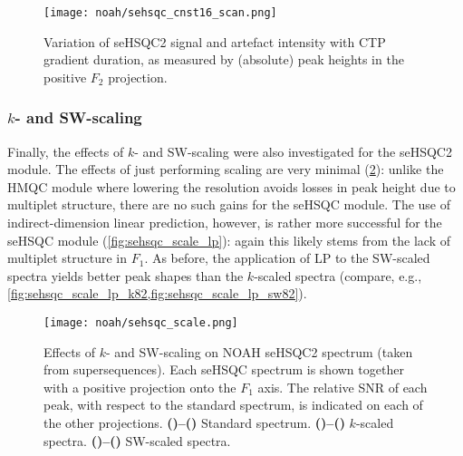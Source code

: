 \begin{figure}[!ht]
    \centering
    \texttt{[image: noah/sehsqc\_cnst16\_scan.png]}%
    \caption[Variation of seHSQC2 signal and artefact intensity with CTP gradient duration]{
        Variation of seHSQC2 signal and artefact intensity with CTP gradient duration, as measured by (absolute) peak heights in the positive $F_2$ projection.
    }
    \label{fig:sehsqc_cnst16}
\end{figure}


\subsubsection{$k$- and SW-scaling}

Finally, the effects of $k$- and SW-scaling were also investigated for the seHSQC2 module.
The effects of just performing scaling are very minimal (\cref{fig:sehsqc_scale}): unlike the HMQC module where lowering the resolution avoids losses in peak height due to multiplet structure, there are no such gains for the seHSQC module.
The use of indirect-dimension linear prediction, however, is rather more successful for the seHSQC module (\cref{fig:sehsqc_scale_lp}): again this likely stems from the lack of multiplet structure in $F_1$.
As before, the application of LP to the SW-scaled spectra yields better peak shapes than the $k$-scaled spectra (compare, e.g., \cref{fig:sehsqc_scale_lp_k82,fig:sehsqc_scale_lp_sw82}).

\begin{figure}[!htbp]
    \centering
    \texttt{[image: noah/sehsqc\_scale.png]}%
    {\label{fig:sehsqc_scale_std2}}%
    {\label{fig:sehsqc_scale_std1}}%
    {\label{fig:sehsqc_scale_k22}}%
    {\label{fig:sehsqc_scale_k21}}%
    {\label{fig:sehsqc_scale_k42}}%
    {\label{fig:sehsqc_scale_k41}}%
    {\label{fig:sehsqc_scale_k82}}%
    {\label{fig:sehsqc_scale_k81}}%
    {\label{fig:sehsqc_scale_sw22}}%
    {\label{fig:sehsqc_scale_sw21}}%
    {\label{fig:sehsqc_scale_sw42}}%
    {\label{fig:sehsqc_scale_sw41}}%
    {\label{fig:sehsqc_scale_sw82}}%
    {\label{fig:sehsqc_scale_sw81}}%
    \caption[Effects of $k$- and SW-scaling on NOAH seHSQC2 spectrum]{
        Effects of $k$- and SW-scaling on NOAH seHSQC2 spectrum (taken from  supersequences).
        Each seHSQC spectrum is shown together with a positive projection onto the $F_1$ axis.
        The relative SNR of each peak, with respect to the standard spectrum, is indicated on each of the other projections.
        \textbf{()--()} Standard spectrum.
        \textbf{()--()} $k$-scaled spectra.
        \textbf{()--()} SW-scaled spectra.
    }
    \label{fig:sehsqc_scale}
\end{figure}

